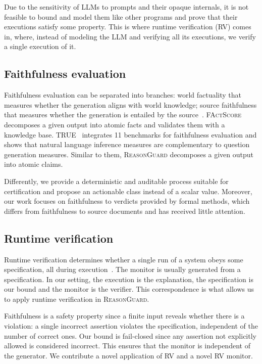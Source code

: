 \documentclass[conference]{IEEEtran}
\newcommand{\rg}{\textsc{ReasonGuard}}
\begin{document}
Due to the sensitivity of LLMs to prompts and their opaque internals, it is not feasible to bound and model them like other programs and prove that their executions satisfy some property. This is where runtime verification (RV) comes in, where, instead of modeling the LLM and verifying all its executions, we verify a single execution of it.

\subsection{Faithfulness evaluation}
Faithfulness evaluation can be separated into branches: world factuality that measures whether the generation aligns with world knowledge; source faithfulness that measures whether the generation is entailed by the source~\cite{Maynez2020Faithfulness}. \textsc{FActScore}~\cite{Min2023FActScore} decomposes a given output into atomic facts and validates them with a knowledge base. \textsc{TRUE}~\cite{Honovich2022True} integrates 11 benchmarks for faithfulness evaluation and shows that natural language inference measures are complementary to question generation measures. Similar to them, \rg{} decomposes a given output into atomic claims.

Differently, we provide a deterministic and auditable process suitable for certification and propose an actionable class instead of a scalar value. Moreover, our work focuses on faithfulness to verdicts provided by formal methods, which differs from faithfulness to source documents and has received little attention.

\subsection{Runtime verification}
Runtime verification determines whether a single run of a system obeys some specification, all during execution~\cite{LeuckerSchallhart2009RuntimeVerification}. The monitor is usually generated from a specification. In our setting, the execution is the explanation, the specification is our bound and the monitor is the verifier. This correspondence is what allows us to apply runtime verification in \rg{}.

Faithfulness is a safety property since a finite input reveals whether there is a violation: a single incorrect assertion violates the specification, independent of the number of correct ones. Our bound is fail-closed since any assertion not explicitly allowed is considered incorrect. This ensures that the monitor is independent of the generator. We contribute a novel application of RV and a novel RV monitor.
\end{document}
